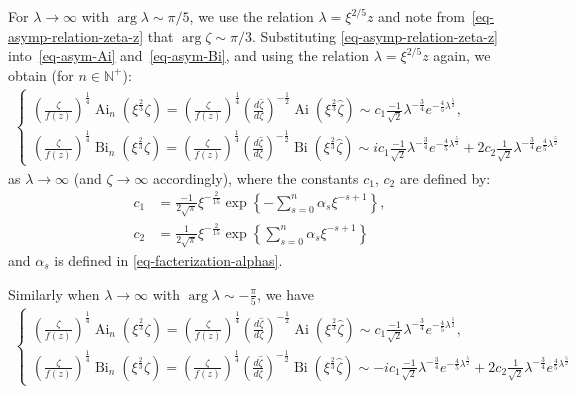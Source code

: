 \documentclass[12pt]{article}
\theoremstyle{plain}
\theoremstyle{definition}
\numberwithin{equation}{section}
\newcommand\Ai{\operatorname{Ai}}
\newcommand\Bi{\operatorname{Bi}}
\begin{document}
For $\lambda \to \infty$ with $\arg \lambda \sim \pi/5$, we use the relation $\lambda = \xi^{2/5} z$ and note from~\eqref{eq-asymp-relation-zeta-z} that $\arg \zeta \sim \pi/3$. Substituting \eqref{eq-asymp-relation-zeta-z} into~\eqref{eq-asym-Ai} and~\eqref{eq-asym-Bi}, and using the relation $\lambda = \xi^{2/5} z$ again, we obtain (for $n \in \mathbb{N}^{+}$):
\begin{eqnarray}\label{eq-Ai-Bi-pi/5}
\begin{cases}
\left(\frac{\zeta}{f(z)}\right)^{\frac{1}{4}}\Ai_{n}(\xi^{\frac{2}{3}}\zeta)=\left(\frac{\zeta}{f(z)}\right)^{\frac{1}{4}}\left(\frac{d\widehat{\zeta}}{d\zeta}\right)^{-\frac{1}{2}}\Ai\left(\xi^{\frac{2}{3}}\widehat{\zeta}\right)\sim c_{1}\frac{-1}{\sqrt{2}}\lambda^{-\frac{3}{4}}e^{-\frac{4}{5}\lambda^{\frac{5}{2}}},\\
\left(\frac{\zeta}{f(z)}\right)^{\frac{1}{4}}\Bi_{n}(\xi^{\frac{2}{3}}\zeta)=\left(\frac{\zeta}{f(z)}\right)^{\frac{1}{4}}\left(\frac{d\widehat{\zeta}}{d\zeta}\right)^{-\frac{1}{2}}\Bi\left(\xi^{\frac{2}{3}}\widehat{\zeta}\right)\sim ic_{1}\frac{-1}{\sqrt{2}}\lambda^{-\frac{3}{4}}e^{-\frac{4}{5}\lambda^{\frac{5}{2}}}+2c_{2}\frac{1}{\sqrt{2}}\lambda^{-\frac{3}{4}}e^{\frac{4}{5}\lambda^{\frac{5}{2}}}
\end{cases}
\end{eqnarray}
as $\lambda\to\infty$ (and $\zeta\to\infty$ accordingly), where the constants $c_1$, $c_2$ are defined by:
\begin{equation}\label{eq-def-c1-c2}
\begin{split}
c_{1}&=\frac{-1}{2\sqrt{\pi}}\xi^{-\frac{2}{15}}\exp\left\{-\sum\limits_{s=0}^{n}\alpha_{s}\xi^{-s+1}\right\},\\
c_{2}&=\frac{1}{2\sqrt{\pi}}\xi^{-\frac{2}{15}}\exp\left\{\sum\limits_{s=0}^{n}\alpha_{s}\xi^{-s+1}\right\}
\end{split}
\end{equation}
and $\alpha_{s}$ is defined in \eqref{eq-facterization-alphas}.

Similarly when $\lambda\to\infty$ with $\arg\lambda\sim-\frac{\pi}{5}$, we have
\begin{eqnarray}\label{eq-Ai-Bi--pi/5}
\begin{cases}
\left(\frac{\zeta}{f(z)}\right)^{\frac{1}{4}}\Ai_{n}(\xi^{\frac{2}{3}}\zeta)=\left(\frac{\zeta}{f(z)}\right)^{\frac{1}{4}}\left(\frac{d\widehat{\zeta}}{d\zeta}\right)^{-\frac{1}{2}}\Ai\left(\xi^{\frac{2}{3}}\widehat{\zeta}\right)\sim c_{1}\frac{-1}{\sqrt{2}}\lambda^{-\frac{3}{4}}e^{-\frac{4}{5}\lambda^{\frac{5}{2}}},\\
\left(\frac{\zeta}{f(z)}\right)^{\frac{1}{4}}\Bi_{n}(\xi^{\frac{2}{3}}\zeta)=\left(\frac{\zeta}{f(z)}\right)^{\frac{1}{4}}\left(\frac{d\widehat{\zeta}}{d\zeta}\right)^{-\frac{1}{2}}\Bi\left(\xi^{\frac{2}{3}}\widehat{\zeta}\right)\sim -ic_{1}\frac{-1}{\sqrt{2}}\lambda^{-\frac{3}{4}}e^{-\frac{4}{5}\lambda^{\frac{5}{2}}}+2c_{2}\frac{1}{\sqrt{2}}\lambda^{-\frac{3}{4}}e^{\frac{4}{5}\lambda^{\frac{5}{2}}}
\end{cases}
\end{eqnarray}
\end{document}
